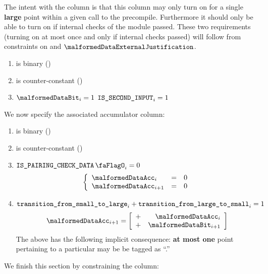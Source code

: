 The intent with the \malformedDataBit{} column is that this column may only turn on for a single \textbf{large} point within a given call to the  precompile. Furthermore it should only be able to turn on if internal checks of the module passed.
These two requirements (turning on at most once and only if internal checks passed) will follow from constraints on \malformedDataAcc{} and $\malformedDataExternalJustification$.

\begin{enumerate}
    \item \malformedDataBit{} is binary \quad (\trash)
    \item \malformedDataBit{} is counter-constant \quad (\trash)
    \item \If $\malformedDataBit_{i} = 1$ \Then $\texttt{IS\_SECOND\_INPUT}_{i} = 1$
\end{enumerate}
We now specify the associated accumulator column:
\begin{enumerate}[resume]
    \item \malformedDataAcc{} is binary \quad (\trash)
    \item \malformedDataAcc{} is counter-constant \quad (\trash)
    \item \If $\isBlsPairingCheckData_{i} = 0$ \Then
          \[
              \left\{ \begin{array}{lcl}
                  \malformedDataAcc _{i}     & = & 0 \\
                  \malformedDataAcc _{i + 1} & = & 0 \\
              \end{array} \right.
          \]
    \item \If $\texttt{transition\_from\_small\_to\_large}_{i} + \texttt{transition\_from\_large\_to\_small}_{i} = 1$ \Then
          \[
              \malformedDataAcc _{i + 1} =
              \left[ \begin{array}{cr}
                      + & \malformedDataAcc _{i}     \\
                      + & \malformedDataBit    _{i + 1} \\
                  \end{array} \right]
          \]
          \saNote{} The above has the following implicit consequence: \textbf{at most one} point pertaining to a particular \blsId{} may be be tagged as ``\malformedDataBit.''
\end{enumerate}
We finish this section by constraining the \malformedDataExternalJustification{} column:
